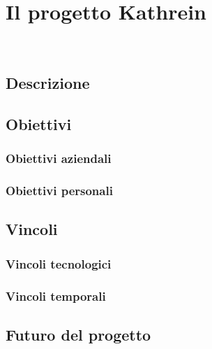 
\chapter{Il progetto Kathrein}
\label{cap:lo-stage}

\\

\section{Descrizione}


\section{Obiettivi}
\subsection{Obiettivi aziendali}
\subsection{Obiettivi personali}

\section{Vincoli}
\subsection{Vincoli tecnologici}
\subsection{Vincoli temporali}

\section{Futuro del progetto}
